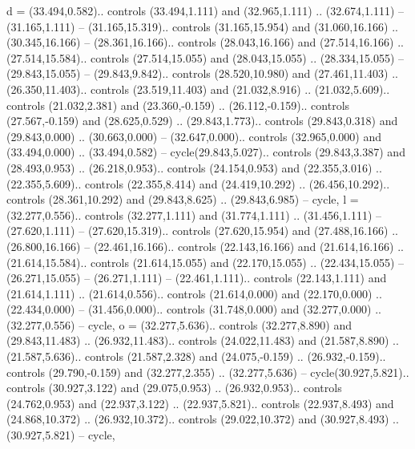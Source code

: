 {d} = {(33.494,0.582).. controls (33.494,1.111) and (32.965,1.111) .. (32.674,1.111) -- (31.165,1.111) -- (31.165,15.319).. controls (31.165,15.954) and (31.060,16.166) .. (30.345,16.166) -- (28.361,16.166).. controls (28.043,16.166) and (27.514,16.166) .. (27.514,15.584).. controls (27.514,15.055) and (28.043,15.055) .. (28.334,15.055) -- (29.843,15.055) -- (29.843,9.842).. controls (28.520,10.980) and (27.461,11.403) .. (26.350,11.403).. controls (23.519,11.403) and (21.032,8.916) .. (21.032,5.609).. controls (21.032,2.381) and (23.360,-0.159) .. (26.112,-0.159).. controls (27.567,-0.159) and (28.625,0.529) .. (29.843,1.773).. controls (29.843,0.318) and (29.843,0.000) .. (30.663,0.000) -- (32.647,0.000).. controls (32.965,0.000) and (33.494,0.000) .. (33.494,0.582) -- cycle(29.843,5.027).. controls (29.843,3.387) and (28.493,0.953) .. (26.218,0.953).. controls (24.154,0.953) and (22.355,3.016) .. (22.355,5.609).. controls (22.355,8.414) and (24.419,10.292) .. (26.456,10.292).. controls (28.361,10.292) and (29.843,8.625) .. (29.843,6.985) -- cycle},
{l} = {(32.277,0.556).. controls (32.277,1.111) and (31.774,1.111) .. (31.456,1.111) -- (27.620,1.111) -- (27.620,15.319).. controls (27.620,15.954) and (27.488,16.166) .. (26.800,16.166) -- (22.461,16.166).. controls (22.143,16.166) and (21.614,16.166) .. (21.614,15.584).. controls (21.614,15.055) and (22.170,15.055) .. (22.434,15.055) -- (26.271,15.055) -- (26.271,1.111) -- (22.461,1.111).. controls (22.143,1.111) and (21.614,1.111) .. (21.614,0.556).. controls (21.614,0.000) and (22.170,0.000) .. (22.434,0.000) -- (31.456,0.000).. controls (31.748,0.000) and (32.277,0.000) .. (32.277,0.556) -- cycle},
{o} = {(32.277,5.636).. controls (32.277,8.890) and (29.843,11.483) .. (26.932,11.483).. controls (24.022,11.483) and (21.587,8.890) .. (21.587,5.636).. controls (21.587,2.328) and (24.075,-0.159) .. (26.932,-0.159).. controls (29.790,-0.159) and (32.277,2.355) .. (32.277,5.636) -- cycle(30.927,5.821).. controls (30.927,3.122) and (29.075,0.953) .. (26.932,0.953).. controls (24.762,0.953) and (22.937,3.122) .. (22.937,5.821).. controls (22.937,8.493) and (24.868,10.372) .. (26.932,10.372).. controls (29.022,10.372) and (30.927,8.493) .. (30.927,5.821) -- cycle},
